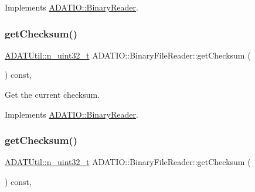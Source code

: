 Implements \mbox{\hyperlink{classADATIO_1_1BinaryReader_acd705bb96d557a5437410b55beb40bda}{A\+D\+A\+T\+I\+O\+::\+Binary\+Reader}}.

\mbox{\label{classADATIO_1_1BinaryFileReader_addb0cfdf4c3df174327b1abc136cfc68}} 
\subsubsection{\texorpdfstring{getChecksum()}{getChecksum()}\hspace{0.1cm}{\footnotesize\ttfamily [2/3]}}
{\footnotesize\ttfamily \mbox{\hyperlink{namespaceADATUtil_ad945a8afa4db2d1f89b731964adae97e}{A\+D\+A\+T\+Util\+::n\+\_\+uint32\+\_\+t}} A\+D\+A\+T\+I\+O\+::\+Binary\+File\+Reader\+::get\+Checksum (\begin{DoxyParamCaption}{ }\end{DoxyParamCaption}) const\hspace{0.3cm}{\ttfamily [inline]}, {\ttfamily [virtual]}}



Get the current checksum. 



Implements \mbox{\hyperlink{classADATIO_1_1BinaryReader_acd705bb96d557a5437410b55beb40bda}{A\+D\+A\+T\+I\+O\+::\+Binary\+Reader}}.

\mbox{\label{classADATIO_1_1BinaryFileReader_addb0cfdf4c3df174327b1abc136cfc68}} 
\subsubsection{\texorpdfstring{getChecksum()}{getChecksum()}\hspace{0.1cm}{\footnotesize\ttfamily [3/3]}}
{\footnotesize\ttfamily \mbox{\hyperlink{namespaceADATUtil_ad945a8afa4db2d1f89b731964adae97e}{A\+D\+A\+T\+Util\+::n\+\_\+uint32\+\_\+t}} A\+D\+A\+T\+I\+O\+::\+Binary\+File\+Reader\+::get\+Checksum (\begin{DoxyParamCaption}{ }\end{DoxyParamCaption}) const\hspace{0.3cm}{\ttfamily [inline]}, {\ttfamily [virtual]}}



